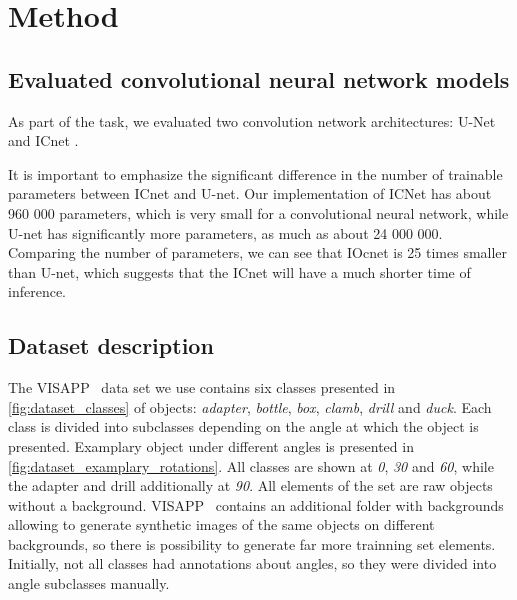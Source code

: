 \documentclass{article}
\begin{document}
\section{Method}
\label{sec:method}
\subsection{Evaluated convolutional neural network models}
\label{sec:evaluated_models}
As part of the task, we evaluated two convolution network architectures: U-Net \cite{unet} and ICnet \cite{icnet}.

It is important to emphasize the significant difference in the number of trainable parameters between ICnet and U-net. Our implementation of ICNet has about 960 000 parameters, which is very small for a convolutional neural network, while U-net has significantly more parameters, as much as about 24 000 000. Comparing the number of parameters, we can see that IOcnet is 25 times smaller than U-net, which suggests that the ICnet will have a much shorter time of inference.


\subsection{Dataset description}
\label{sec:dataset_desc}
The VISAPP~\cite{visapp} data set we use contains six classes presented in \ref{fig:dataset_classes} of objects: \textit{adapter}, \textit{bottle}, \textit{box}, \textit{clamb}, \textit{drill} and \textit{duck}. Each class is divided into subclasses depending on the angle at which the object is presented. Examplary object under different angles is presented in \ref{fig:dataset_examplary_rotations}. All classes are shown at \textit{0\degree}, \textit{30\degree} and \textit{60\degree}, while the adapter and drill additionally at \textit{90\degree}. All elements of the set are raw objects without a background. VISAPP~\cite{visapp} contains an additional folder with backgrounds allowing to generate synthetic images of the same objects on different backgrounds, so there is possibility to  generate far more trainning set elements. Initially, not all classes had annotations about angles, so they were divided into angle subclasses manually.
\end{document}
